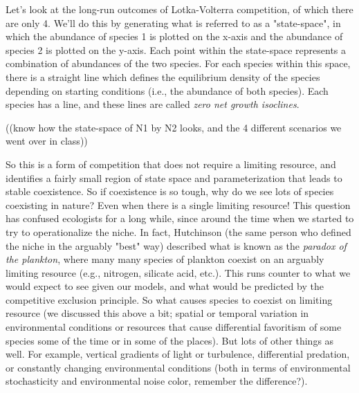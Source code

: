 \documentclass[12pt]{article}
\begin{document}
Let's look at the long-run outcomes of Lotka-Volterra competition, of which there are only 4. We'll do this by generating what is referred to as a "state-space", in which the abundance of species 1 is plotted on the x-axis and the abundance of species 2 is plotted on the y-axis. Each point within the state-space represents a combination of abundances of the two species. For each species within this space, there is a straight line which defines the equilibrium density of the species depending on starting conditions (i.e., the abundance of both species). Each species has a line, and these lines are called \textit{zero net growth isoclines}. 





\bigskip

((know how the state-space of N1 by N2 looks, and the 4 different scenarios we went over in class))




So this is a form of competition that does not require a limiting resource, and identifies a fairly small region of state space and parameterization that leads to stable coexistence. So if coexistence is so tough, why do we see lots of species coexisting in nature? Even when there is a single limiting resource! This question has confused ecologists for a long while, since around the time when we started to try to operationalize the niche. In fact, Hutchinson (the same person who defined the niche in the arguably "best" way) described what is known as the \textit{paradox of the plankton}, where many many species of plankton coexist on an arguably limiting resource (e.g., nitrogen, silicate acid, etc.). This runs counter to what we would expect to see given our models, and what would be predicted by the competitive exclusion principle. So what causes species to coexist on limiting resource (we discussed this above a bit; spatial or temporal variation in environmental conditions or resources that cause differential favoritism of some species some of the time or in some of the places). But lots of other things as well. For example, vertical gradients of light or turbulence, differential predation, or constantly changing environmental conditions (both in terms of environmental stochasticity and environmental noise color, remember the difference?).
\end{document}
